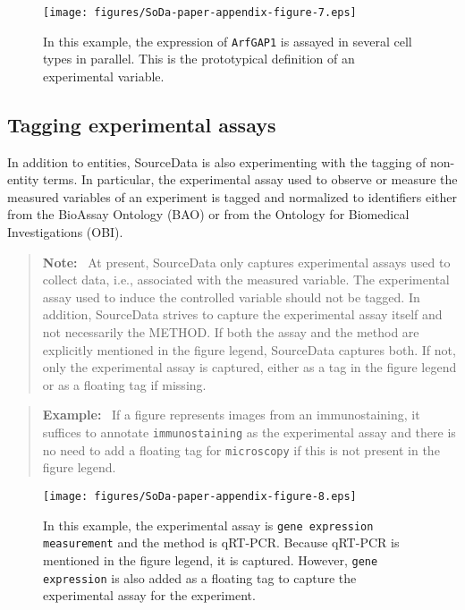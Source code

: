 \documentclass{bioinfo}
\newenvironment{note}
{\par\color{black}\begin{quote}\textbf{Note:}\ }
{\end{quote}\par}
\newenvironment{example}
{\par\color{black}\begin{quote}\textbf{Example:}\ }
{\end{quote}\par}
\begin{document}
\begin{figure*}
    \centering
    \texttt{[image: figures/SoDa-paper-appendix-figure-7.eps]}
    \caption{In this example, the expression of \texttt{ArfGAP1} is assayed in several cell types in parallel. This is the prototypical definition of an experimental variable.}
    \label{fig:experimental_variable}
\end{figure*}

\subsection{Tagging experimental assays}\label{app:tagging-experimental-assays}
In addition to entities, SourceData is also experimenting with the tagging of non-entity terms. In particular, the experimental assay used to observe or measure the measured variables of an experiment is tagged and normalized to identifiers either from the BioAssay Ontology (BAO) or from the Ontology for Biomedical Investigations (OBI).

\begin{note}
    At present, SourceData only captures experimental assays used to collect data, i.e., associated with the measured variable. The experimental assay used to induce the controlled variable should not be tagged. In addition, SourceData strives to capture the experimental assay itself and not necessarily the METHOD. If both the assay and the method are explicitly mentioned in the figure legend, SourceData captures both. If not, only the experimental assay is captured, either as a tag in the figure legend or as a floating tag if missing.
\end{note}

\begin{example}
    If a figure represents images from an immunostaining, it suffices to annotate \texttt{immunostaining} as the experimental assay and there is no need to add a floating tag for \texttt{microscopy} if this is not present in the figure legend.
\end{example}

\begin{figure*}
    \centering
    \texttt{[image: figures/SoDa-paper-appendix-figure-8.eps]}
    \caption{In this example, the experimental assay is \texttt{gene expression measurement} and the method is qRT-PCR. Because qRT-PCR is mentioned in the figure legend, it is captured. However, \texttt{gene expression} is also added as a floating tag to capture the experimental assay for the experiment.}
    \label{fig:assay_method}
\end{figure*}
\end{document}
